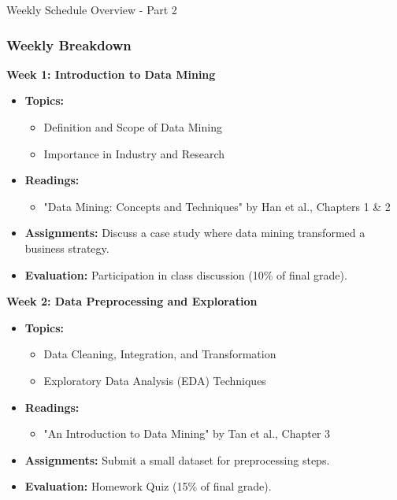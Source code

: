 \documentclass[aspectratio=169]{beamer}
\begin{document}
\begin{frame}[fragile]{Weekly Schedule Overview - Part 2}
  \frametitle{Weekly Breakdown}
  
  \textbf{Week 1: Introduction to Data Mining}
  \begin{itemize}
    \item \textbf{Topics:}
    \begin{itemize}
      \item Definition and Scope of Data Mining
      \item Importance in Industry and Research
    \end{itemize}
    \item \textbf{Readings:} 
    \begin{itemize}
      \item "Data Mining: Concepts and Techniques" by Han et al., Chapters 1 \& 2
    \end{itemize}
    \item \textbf{Assignments:} 
    Discuss a case study where data mining transformed a business strategy.
    \item \textbf{Evaluation:} Participation in class discussion (10\% of final grade).
  \end{itemize}

  \textbf{Week 2: Data Preprocessing and Exploration} 
  \begin{itemize}
    \item \textbf{Topics:}
    \begin{itemize}
      \item Data Cleaning, Integration, and Transformation
      \item Exploratory Data Analysis (EDA) Techniques
    \end{itemize}
    \item \textbf{Readings:} 
    \begin{itemize}
      \item "An Introduction to Data Mining" by Tan et al., Chapter 3
    \end{itemize}
    \item \textbf{Assignments:} Submit a small dataset for preprocessing steps.
    \item \textbf{Evaluation:} Homework Quiz (15\% of final grade).
  \end{itemize}  
\end{frame}
\end{document}
